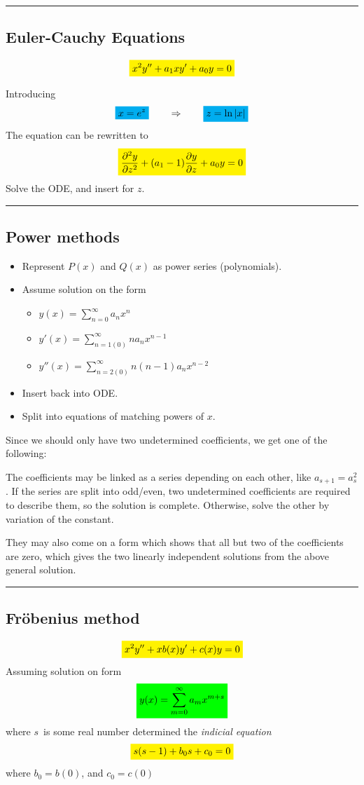 \documentclass[10pt,a4paper]{article}
\renewcommand{\exp}{e^}
\newcommand{\holine}[1][\medskipamount]{\par\vspace*{\dimexpr-\parskip-\baselineskip+#1}\noindent\rule{\linewidth}{1pt}\par\vspace*{\dimexpr-\parskip-.5\baselineskip+#1}}
\newcommand{\yl}[1]{\colorbox{yellow}{$\displaystyle #1$}}
\newcommand{\gr}[1]{\colorbox{green}{$\displaystyle #1$}}
\newcommand{\bl}[1]{\colorbox{cyan}{$\displaystyle #1$}}
\begin{document}
\begin{multicols}{2}
\holine
\subsection*{Euler-Cauchy Equations}
\[\yl{
    x^2y'' + a_1x y' + a_0 y = 0
}\]

Introducing
\[
    \bl{x = \exp{z}} \quad\quad\Rightarrow\quad\quad \bl{z = \ln|x|}
\]
The equation can be rewritten to
\[\yl{
    \pdv[2]{y}{z} + (a_1-1)\pdv{y}{z} + a_0 y = 0
}\]
Solve the ODE, and insert for $z$.



\holine
\subsection*{Power methods}
\begin{itemize}
    \item Represent $P(x)$ and $Q(x)$ as power series (polynomials).
    \item Assume solution on the form
    \begin{itemize}
        \item $y(x) = \sum_{n=0}^\infty a_n x^n$
        \item $y'(x) = \sum_{n=1(0)}^\infty n a_n x^{n-1}$
        \item $y''(x) = \sum_{n=2(0)}^\infty n(n-1) a_n x^{n-2}$ 
    \end{itemize}
    \item Insert back into ODE.
    \item Split into equations of matching powers of $x$.
\end{itemize}
Since we should only have two undetermined coefficients, we get one of the following:

The coefficients may be linked as a series depending on each other, like $a_{s+1} = a_s^2$. If the series are split into odd/even, two undetermined coefficients are required to describe them, so the solution is complete. Otherwise, solve the other by variation of the constant.

They may also come on a form which shows that all but two of the coefficients are zero, which gives the two linearly independent solutions from the above general solution.



\holine
\subsection*{Fröbenius method}
\[\yl{
    x^2 y'' + xb(x)y' + c(x) y = 0
}\]
Assuming solution on form
\[\gr{
    y(x) = \sum_{m=0}^\infty a_m x^{m+s}
}\]
where $s$ is some real number determined  the \textit{indicial equation}
\[\yl{
    s(s-1) + b_0s + c_0 = 0
}\]
where $b_0=b(0)$, and $c_0=c(0)$


\end{multicols}
\end{document}
